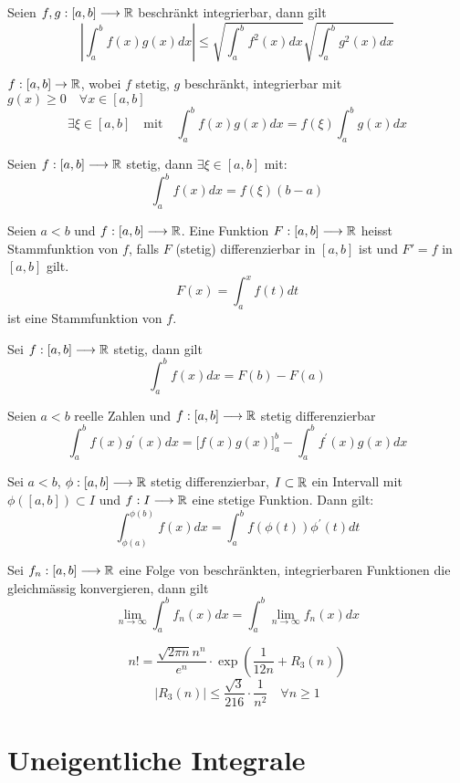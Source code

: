  Seien $f,g : [a,b] \longrightarrow \mathbb{R}$ beschränkt integrierbar, dann gilt
$$
\left|\int_{a}^{b} f(x) g(x) d x\right| \leqslant \sqrt{\int_{a}^{b} f^{2}(x) d x} \sqrt{\int_{a}^{b} g^{2}(x) d x}
$$


\Satz[Cauchy] $ f: [a, b] \rightarrow \mathbb{R}$, wobei $f$ stetig, $g$ beschränkt, integrierbar mit $g(x) \geq 0 \quad \forall x \in [a,b]$
\[ \exists \xi \in [a, b] \quad \text{mit} \quad \int_a^b f(x) g(x) dx = f(\xi) \int_a^b g(x) dx  \]

\Satz[Mittelwertsatz] Seien $f : [a,b] \longrightarrow \mathbb{R}$ stetig, dann $\exists \xi \in [a,b]$ mit:
$$\int_a^b f(x) dx = f(\xi)(b-a)$$


\Satz[Stammfunktion] Seien $a < b$ und $f : [a,b] \longrightarrow \mathbb{R}$. Eine Funktion $F : [a,b] \longrightarrow \mathbb{R}$  heisst Stammfunktion von $f$, falls $F$ (stetig) differenzierbar in $[a,b]$ ist und $F' = f$ in $[a,b]$ gilt. \\
$$F(x) = \int_a^x f(t) dt$$ ist eine Stammfunktion von $f$.

\Satz[Fundamentalsatz] Sei $f : [a,b] \longrightarrow \mathbb{R}$ stetig, dann gilt
$$\int_a^b f(x) dx = F(b)-F(a)$$

 Seien $a < b$ reelle Zahlen und $f : [a,b] \longrightarrow \mathbb{R}$ stetig differenzierbar
$$
\int_{a}^{b} f(x) g^{\prime}(x) dx = \Big[f(x)g(x)\Big]_a^b - \int_{a}^{b} f^{\prime}(x) g(x) dx
$$

\Satz[Substitution] Sei $a<b$, $\phi : [a,b] \longrightarrow \mathbb{R}$ stetig differenzierbar, $I \subset \mathbb{R}$ ein Intervall mit $\phi([a,b]) \subset I$ und $f: I \longrightarrow \mathbb{R}$ eine stetige Funktion. Dann gilt:
$$
\int_{\phi(a)}^{\phi(b)} f(x) dx=\int_{a}^{b} f(\phi(t)) \phi^{\prime}(t) dt
$$

\Satz Sei $f_n : [a,b] \longrightarrow \mathbb{R}$ eine Folge von beschränkten, integrierbaren Funktionen die gleichmässig konvergieren, dann gilt
$$
\lim_{n \rightarrow \infty} \int_a^b f_n(x) dx = \int_a^b \lim_{n \rightarrow \infty} f_n(x) dx
$$

\Satz[Stirling] 
$$
n !=\frac{\sqrt{2 \pi n} n^{n}}{e^{n}} \cdot \exp \left(\frac{1}{12 n}+R_{3}(n)\right)
$$
$$
\left|R_{3}(n)\right| \leqslant \frac{\sqrt{3}}{216} \cdot \frac{1}{n^{2}} \quad \forall n \geqslant 1
$$

\section{Uneigentliche Integrale}

